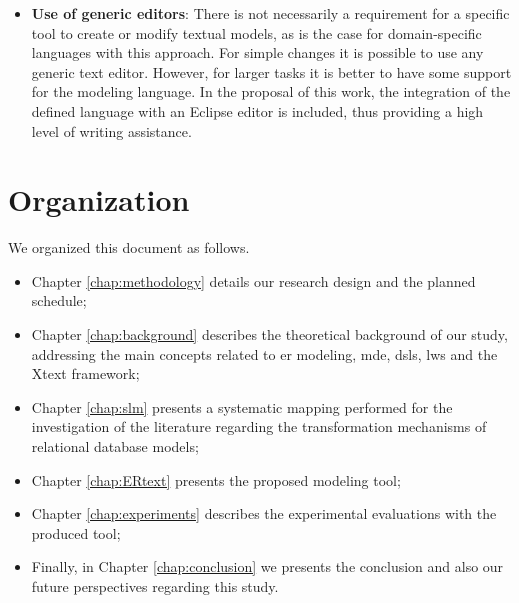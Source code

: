 \begin{itemize}
    \item \textbf{Use of generic editors}: There is not necessarily a requirement for a specific tool to create or modify textual models, as is the case for domain-specific languages with this approach.
    For simple changes it is possible to use any generic text editor.
    However, for larger tasks it is better to have some support for the modeling language.
    In the proposal of this work, the integration of the defined language with an Eclipse editor is included, thus providing a high level of writing assistance.
\end{itemize}

\section{Organization}

We organized this document as follows.

\begin{itemize}
    \item Chapter \ref{chap:methodology} details our research design and the planned schedule;
    \item Chapter \ref{chap:background} describes the theoretical background of our study, addressing the main concepts related to \ac{er} modeling, \ac{mde}, \acp{dsl}, \acp{lw} and the Xtext framework;
    \item Chapter \ref{chap:slm} presents a systematic mapping performed for the investigation of the literature regarding the transformation mechanisms of relational database models;
    \item Chapter \ref{chap:ERtext} presents the proposed modeling tool;
    \item Chapter \ref{chap:experiments} describes the experimental evaluations with the produced tool;
    \item Finally, in Chapter \ref{chap:conclusion} we presents the conclusion and also our future perspectives regarding this study.
\end{itemize}



